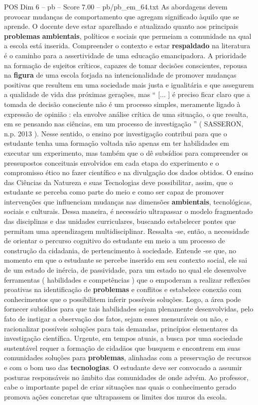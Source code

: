 \begin{textsample}{POS Dim 6 – pb – Score 7.00 – pb/pb\_em\_64.txt}
As abordagens devem provocar mudanças de comportamento que agregam significado àquilo que se aprende.
O docente deve estar aparelhado e atualizado quanto aos principais \textbf{problemas} \textbf{ambientais}, políticos e sociais que permeiam a comunidade na qual a escola está inserida.
Compreender o contexto e estar \textbf{respaldado} na literatura é o caminho para a assertividade de uma educação emancipadora.
A prioridade na formação de sujeitos críticos, capazes de tomar decisões conscientes, repousa na \textbf{figura} de uma escola forjada na intencionalidade de promover mudanças positivas que resultem em uma sociedade mais justa e igualitária e que assegurem a qualidade de vida das próximas gerações, mas “ [... ] é preciso ficar claro que a tomada de decisão consciente não é um processo simples, meramente ligado à expressão de opinião : ela envolve análise crítica de uma situação, o que resulta, em se pensando nas ciências, em um processo de investigação ” ( SASSERON, n.p. 2013 ).
Nesse sentido, o ensino por investigação contribui para que o estudante tenha uma formação voltada não apenas em ter habilidades em executar um experimento, mas também que o dê subsídios para compreender os pressupostos conceituais envolvidos em cada etapa do experimento e o compromisso ético no fazer científico e na divulgação dos dados obtidos.
O ensino das Ciências da Natureza e suas Tecnologias deve possibilitar, assim, que o estudante se perceba como parte do meio e como ser capaz de promover intervenções que influenciam mudanças nas dimensões \textbf{ambientais}, tecnológicas, sociais e culturais.
Dessa maneira, é necessário ultrapassar o modelo fragmentado das disciplinas e das unidades curriculares, buscando estabelecer pontes que permitam uma aprendizagem multidisciplinar.
Ressalta -se, então, a necessidade de orientar o percurso cognitivo do estudante em meio a um processo de construção da cidadania, de pertencimento à sociedade.
Entende -se que, no momento em que o estudante se percebe inserido em seu contexto social, ele sai de um estado de inércia, de passividade, para um estado no qual ele desenvolve ferramentas ( habilidades e competências ) que o empoderam a realizar reflexões proativas na identificação de \textbf{problemas} e conflitos e estabelece conexão com conhecimentos que o possibilitem inferir possíveis soluções.
Logo, a área pode fornecer subsídios para que tais habilidades sejam plenamente desenvolvidas, pelo fato de instigar a observação dos fatos, sejam esses mensuráveis ou não, e racionalizar possíveis soluções para tais demandas, princípios elementares da investigação científica.
Urgente, em tempos atuais, a busca por uma sociedade sustentável requer a formação de cidadãos que busquem e encontrem em suas comunidades soluções para \textbf{problemas}, alinhadas com a preservação de recursos e com o bom uso das \textbf{tecnologias}.
O estudante deve ser convocado a assumir posturas responsáveis no âmbito das comunidades de onde advém.
Ao professor, cabe o importante papel de criar situações nas quais o conhecimento gerado promova ações concretas que ultrapassem os limites dos muros da escola.

\end{textsample}
